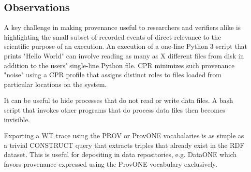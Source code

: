 \subsection{Observations}

A key challenge in making provenance useful to researchers and verifiers alike is highlighting the small subset of recorded events of direct relevance to the scientific purpose of an execution. An execution of a one-line Python 3 script that prints "Hello World" can involve reading as many as X different files from disk in addition to the users' single-line Python file. CPR minimizes such provenance "noise" using a CPR profile that assigns distinct roles to files loaded from particular locations on the system.

It can be useful to hide processes that do not read or write data files.  A bash script that invokes other programs that do process data files then becomes invisible.

Exporting a WT trace using the PROV or ProvONE vocabalaries is as simple as a trivial CONSTRUCT query that extracts triples that already exist in the RDF dataset.  This is useful for depositing in data repositories, e.g. DataONE which favors provenance expressed using the ProvONE vocabulary exclusively.


